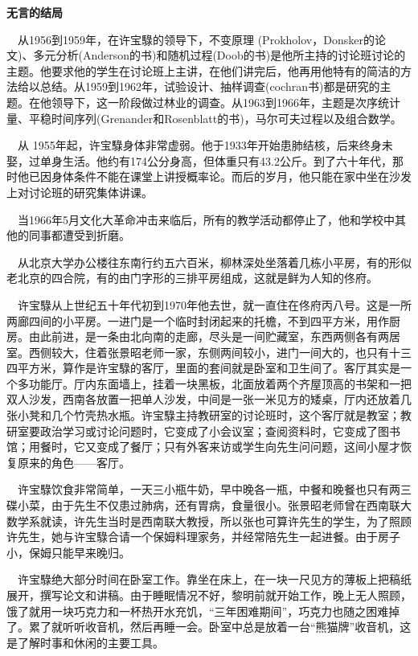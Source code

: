 \textbf{无言的结局}

$\quad$从1956到1959年，在许宝騄的领导下，不变原理 (Prokholov，Donsker的论文)、多元分析(Anderson的书)和随机过程(Doob的书)是他所主持的讨论班讨论的主题。他要求他的学生在讨论班上主讲，在他们讲完后，他再用他特有的简洁的方法给以总结。从1959到1962年，试验设计、抽样调查(cochran书)都是研究的主题。在他领导下，这一阶段做过林业的调查。从1963到1966年，主题是次序统计量、平稳时间序列(Grenander和Rosenblatt的书)，马尔可夫过程以及组合数学。

$\quad$从 1955年起，许宝騄身体非常虚弱。他于1933年开始患肺结核，后来终身未娶，过单身生活。他约有174公分身高，但体重只有43.2公斤。到了六十年代，那时他已因身体条件不能在课堂上讲授概率论。而后的岁月，他只能在家中坐在沙发上对讨论班的研究集体讲课。

$\quad$当1966年5月文化大革命冲击来临后，所有的教学活动都停止了，他和学校中其他的同事都遭受到折磨。

$\quad$从北京大学办公楼往东南行约五六百米，柳林深处坐落着几栋小平房，有的形似老北京的四合院，有的由门字形的三排平房组成，这就是鲜为人知的佟府。

$\quad$许宝騄从上世纪五十年代初到1970年他去世，就一直住在佟府丙八号。这是一所两廊四间的小平房。一进门是一个临时封闭起来的托檐，不到四平方米，用作厨房。由此前进，是一条由北向南的走廊，尽头是一间贮藏室，东西两侧各有两居室。西侧较大，住着张景昭老师一家，东侧两间较小，进门一间大的，也只有十三四平方米，算作是许宝騄的客厅，里面的套间就是卧室和卫生间了。客厅其实是一个多功能厅。厅内东面墙上，挂着一块黑板，北面放着两个齐屋顶高的书架和一把双人沙发，西南各放置一把单人沙发，中间是一张一米见方的矮桌，厅内还放着几张小凳和几个竹壳热水瓶。许宝騄主持教研室的讨论班时，这个客厅就是教室；教研室要政治学习或讨论问题时，它变成了小会议室；查阅资料时，它变成了图书馆；用餐时，它又变成了餐厅；只有外客来访或学生向先生问问题，这间小屋才恢复原来的角色——客厅。

$\quad$许宝騄饮食非常简单，一天三小瓶牛奶，早中晚各一瓶，中餐和晚餐也只有两三碟小菜，由于先生不仅患过肺病，还有胃病，食量很小。张景昭老师曾在西南联大数学系就读，许先生当时是西南联大教授，所以张也可算许先生的学生，为了照顾许先生，她与许宝騄合请一个保姆料理家务，并经常陪先生一起进餐。由于房子小，保姆只能早来晚归。

$\quad$许宝騄绝大部分时间在卧室工作。靠坐在床上，在一块一尺见方的薄板上把稿纸展开，撰写论文和讲稿。由于睡眠情况不好，黎明前就开始工作，晚上无人照顾，饿了就用一块巧克力和一杯热开水充饥，“三年困难期间”，巧克力也随之困难掉了。累了就听听收音机，然后再睡一会。卧室中总是放着一台“熊猫牌”收音机，这是了解时事和休闲的主要工具。

